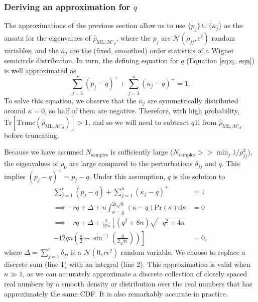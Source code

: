 \documentclass[aps,pra, twocolumn]{revtex4-1}
\newcommand{\M}{\mathcal{M}}
\newcommand{\Tr}{\mathrm{Tr}}
\newcommand{\Id}{\mathbb{I}}
\def\Id{1\!\mathrm{l}}
\newcommand{\rhohat}{\hat{\rho}}
\newcommand{\rhoML}[1]{\rhohat_{\scriptscriptstyle{\mathrm{ML},#1}}}
\begin{document}
\subsubsection{Deriving an approximation for $q$}
The approximations of the previous section allow us to use $\{p_j\} \cup \{\overline{\kappa}_j\}$ as the ansatz for the eigenvalues of $\rhoML{\M'_{d}}$, where the $p_j$ are $\mathcal{N}(\rho_{jj},\epsilon^2)$ random variables, and the $\overline{\kappa}_j$ are the (fixed, smoothed) order statistics of a Wigner semicircle distribution.  In turn, the defining equation for $q$ (Equation \eqref{eq:q_eqn}) is well approximated as
\begin{equation}
\nonumber \sum_{j=1}^{r}(p_j - q)^{+} + \sum_{j=1}^{n}{(\overline{\kappa}_j-q)^+} = 1.
\end{equation}
To solve this equation, we observe that the $\overline{\kappa}_j$ are symmetrically distributed around $
\kappa=0$, so half of them are negative.  Therefore, with high probability, $\Tr
\left[\mathrm{Trunc}(\rhoML{\M'_{d}})\right]>1$, and so we will need to subtract $q\Id$ from $\rhoML{\M'_{d}}$ before truncating.

Because we have assumed $N_{\mathrm{samples}}$ is sufficiently large ($N_{\mathrm{samples}} >> \min_{j}1/\rho_{jj}^{2}$), the eigenvalues of $\rho_{0}$ are large compared to the perturbations $\delta_{jj}$ and $q$. This implies $(p_{j} - q)^{+} = p_{j} - q$. Under this assumption, $q$ is the solution to
\begin{align}
\nonumber \sum_{j=1}^{r}(p_j - q) + \sum_{j=1}^{n}{(\overline{\kappa}_j-q)^+} & = 1\\
\nonumber \implies - rq + \Delta + n\int_{\kappa=q}^{2\epsilon\sqrt{n}}{(\kappa-q)\mathrm{Pr}(\kappa)\mathrm{d}\kappa} & = 0\\
\nonumber \label{eq:q_eqn2}\implies - rq + \Delta + \frac{\epsilon}{12\pi}\left[(q^2+8n)\sqrt{-q^2+4n} \right.\\
\left. -12qn\left(\frac{\pi}{2}-\sin^{-1}\left(\frac{q}{2\sqrt{n}}\right)\right)   \right]&=0,
\end{align}
where $\Delta = \sum_{j=1}^{r}\delta_{jj}$ is a $\mathcal{N}(0,r\epsilon^2)$ random variable.  We choose to replace a discrete 
sum (line 1) with an integral (line 2). This approximation is valid when $n\gg1$, as we can accurately approximate a discrete collection of closely spaced real numbers by a smooth density or distribution over the real numbers that has approximately the same CDF.  It is also remarkably accurate in practice.
  
\end{document}
